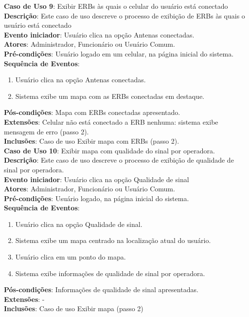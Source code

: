 \documentclass[]{politex}
\begin{document}
\noindent \textbf{Caso de Uso 9}: Exibir ERBs às quais o celular do usuário está
conectado \\
\textbf{Descrição}: Este caso de uso descreve o processo de exibição de ERBs às
quais o usuário está conectado \\
\textbf{Evento iniciador}: Usuário clica na opção Antenas conectadas. \\
\textbf{Atores}: Administrador, Funcionário ou Usuário Comum. \\
\textbf{Pré-condições}: Usuário logado em um celular, na página inicial do
sistema. \\
\textbf{Sequência de Eventos}:
\begin{enumerate}
\item Usuário clica na opção Antenas conectadas.
\item Sistema exibe um mapa com as ERBs conectadas em destaque.
\end{enumerate}
\textbf{Pós-condições}: Mapa com ERBs conectadas apresentado. \\
\textbf{Extensões}: Celular não está conectado a ERB nenhuma: sistema exibe 
mensagem de erro (passo 2). \\
\textbf{Inclusões}: Caso de uso Exibir mapa com ERBs (passo 2). \\


\noindent \textbf{Caso de Uso 10}: Exibir mapa com qualidade do sinal por 
operadora. \\
\textbf{Descrição}: Este caso de uso descreve o processo de exibição de
qualidade de sinal por operadora. \\
\textbf{Evento iniciador}: Usuário clica na opção Qualidade de sinal \\
\textbf{Atores}: Administrador, Funcionário ou Usuário Comum. \\
\textbf{Pré-condições}: Usuário logado, na página inicial do sistema. \\
\textbf{Sequência de Eventos}:
\begin{enumerate}
\item Usuário clica na opção Qualidade de sinal.
\item Sistema exibe um mapa centrado na localização atual do usuário.
\item Usuário clica em um ponto do mapa.
\item Sistema exibe informações de qualidade de sinal por operadora.
\end{enumerate}
\textbf{Pós-condições}: Informações de qualidade de sinal apresentadas. \\
\textbf{Extensões}: - \\
\textbf{Inclusões}: Caso de uso Exibir mapa (passo 2) \\
\end{document}
